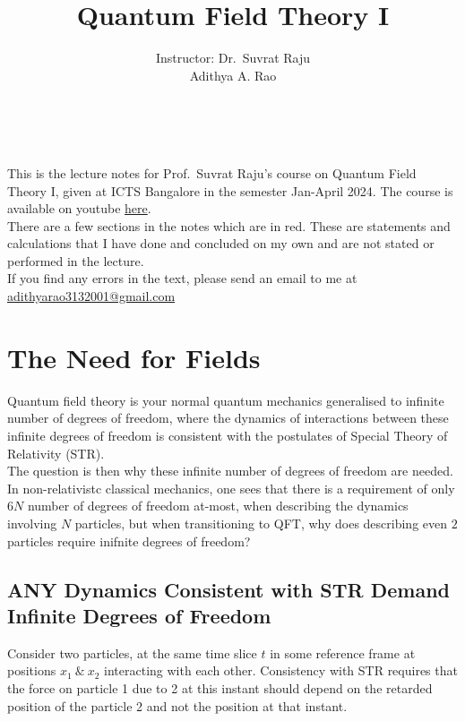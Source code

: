 \documentclass[11pt]{article}
\title{Quantum Field Theory I}
\author{Instructor: Dr.\ Suvrat Raju\vspace{30pt}\\ Adithya A. Rao}
\date{~}
\numberwithin{equation}{section}
\begin{document}
    \maketitle

    This is the lecture notes for Prof.\ Suvrat Raju's course on Quantum Field Theory I, given at ICTS Bangalore in the semester Jan-April 2024.
    The course is available on youtube \href{https://youtu.be/9kqScPIkkRU?si=UH9KUZaF0YiDwxdu}{here}. \\
    There are a few sections in the notes which are in red. These are statements and calculations that I have done and concluded on my own and are not stated or performed in the lecture.\\
    If you find any errors in the text, please send an email to me at \href{mailto:adithyarao3132001@gmail.com}{adithyarao3132001@gmail.com}

    \thispagestyle{empty}
    \tableofcontents
    \newpage
    \setcounter{page}{1}

    
    \section{The Need for Fields}
    Quantum field theory is your normal quantum mechanics generalised to infinite number of degrees of freedom, where the dynamics of interactions between these infinite degrees of freedom is consistent with the postulates of Special Theory of Relativity (STR).\\

    The question is then why these infinite number of degrees of freedom are needed. In non-relativistc classical mechanics, one sees that there is a requirement of only \(6N\) number of degrees of freedom at-most, when describing the dynamics involving \(N\) particles, but when transitioning to QFT, why does describing even \(2\) particles require inifnite degrees of freedom? 

    \subsection{ANY Dynamics Consistent with STR Demand Infinite Degrees of Freedom}
    Consider two particles, at the same time slice \(t\) in some reference frame at positions \(x_1~\&~x_2\) interacting with each other. Consistency with STR requires that the force on particle 1 due to 2 at this instant should depend on the retarded position of the particle 2 and not the position at that instant. 
\end{document}
